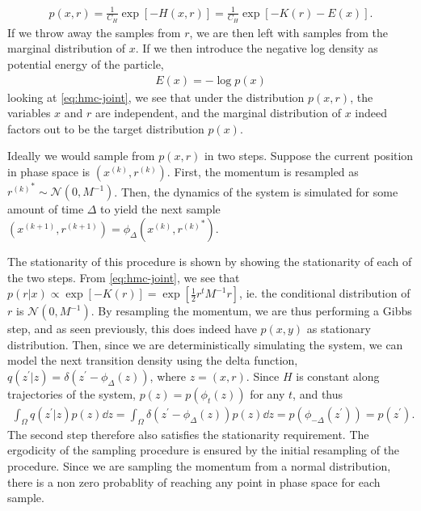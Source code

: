 \begin{align} \label{eq:hmc-joint}
    p(x, r) = \frac{1}{C_H} \exp\left[ -H(x, r)\right] = \frac{1}{C_H} \exp\left[-K(r) - E(x)  \right].
\end{align}
If we throw away the samples from $r$, we are then left with samples from the marginal distribution of $x$.
If we then introduce the negative log density as potential energy of the particle,
\begin{align*}
    E(x) = -\log{p(x)}
\end{align*}
looking at \cref{eq:hmc-joint}, we see that under the distribution $p(x, r)$, the variables $x$ and $r$ are independent, and the marginal distribution of $x$ indeed factors out to be the target distribution $p(x)$. 

\newcommand{\newx}{x^{\prime}}
\newcommand{\newr}{{r^{\prime}}}
\newcommand{\oldx}{{x^{(k)}}}
\newcommand{\oldr}{{r^{(k)}}}
\newcommand{\nextx}{x^{(k+1)}}
\newcommand{\nextr}{{r^{(k+1)}}}

Ideally we would sample from $p(x, r)$ in two steps.
Suppose the current position in phase space is $(\oldx, \oldr)$. 
First, the momentum is resampled as $\oldr^\ast\sim \mathcal{N}(0, M^{-1})$.
Then, the dynamics of the system is simulated for some amount of time $\Delta$ to yield the next sample $(\nextx, \nextr) =\phi_\Delta(\oldx, \oldr^\ast)$.

The stationarity of this procedure is shown by showing the stationarity of each of the two steps.
From \cref{eq:hmc-joint}, we see that $p(r|x) \propto \exp[-K(r)] = \exp[\frac{1}{2}r^tM^{-1}r]$, ie. the conditional distribution of $r$ is $\mathcal{N}(0, M^{-1})$.
By resampling the momentum, we are thus performing a Gibbs step, and as seen previously, this does indeed have $p(x, y)$ as stationary distribution.
Then, since we are deterministically simulating the system, we can model the next transition density using the delta function, $q(z^\prime|z) = \delta(z^\prime - \phi_\Delta(z))$, where $z=(x, r)$. 
Since $H$ is constant along trajectories of the system, $p(z) =p(\phi_t(z))$ for any $t$, and thus
\begin{align} \label{eq:}
    \int_{\Omega} q(z^\prime| z ) p(z) \dd{z} = \int_{\Omega} \delta(z^\prime - \phi_\Delta(z))p(z) \dd{z} 
    = p(\phi_{-\Delta}(z^\prime)) = p(z^\prime).
\end{align}
The second step therefore also satisfies the stationarity requirement.
The ergodicity of the sampling procedure is ensured by the initial resampling of the procedure.
Since we are sampling the momentum from a normal distribution, there is a non zero probablity of reaching any point in phase space for each sample.

